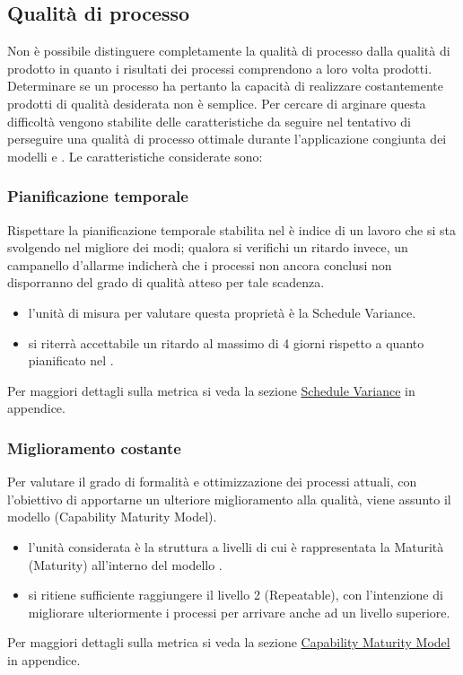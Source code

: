 \documentclass[a4paper, titlepage]{article}
\begin{document}
\subsection{Qualità di processo}
Non è possibile distinguere completamente la qualità di processo dalla qualità di prodotto in quanto i risultati dei processi comprendono a loro volta prodotti. Determinare se un processo ha pertanto la capacità di realizzare costantemente prodotti di qualità desiderata non è semplice. 
\newline Per cercare di arginare questa difficoltà vengono stabilite delle caratteristiche da seguire nel tentativo di perseguire una qualità di processo ottimale durante l'applicazione congiunta dei modelli  e .
\newline Le caratteristiche considerate sono:

\subsubsection{Pianificazione temporale}
Rispettare la pianificazione temporale stabilita nel  è indice di un lavoro che si sta svolgendo nel migliore dei modi; qualora si verifichi un ritardo invece, un campanello d'allarme indicherà che i processi non ancora conclusi non disporranno del grado di qualità atteso per tale scadenza.
\begin{itemize}
\item {} l'unità di misura per valutare questa proprietà è la Schedule Variance.
\item {} si riterrà accettabile un ritardo al massimo di 4 giorni rispetto a quanto pianificato nel .
\end{itemize}
Per maggiori dettagli sulla metrica si veda la sezione \hyperref[par:SV]{Schedule Variance} in appendice.

\subsubsection{Miglioramento costante}
Per valutare il grado di formalità e ottimizzazione dei processi attuali, con l'obiettivo di apportarne un ulteriore miglioramento alla qualità, viene assunto il modello  (Capability Maturity Model).
\begin{itemize}
\item {} l'unità considerata è la struttura a livelli di cui è rappresentata la Maturità (Maturity) all'interno del modello .
\item {} si ritiene sufficiente raggiungere il livello 2 (Repeatable), con l'intenzione di migliorare ulteriormente i processi per arrivare anche ad un livello superiore.
\end{itemize}
Per maggiori dettagli sulla metrica si veda la sezione \hyperref[par:cmm]{Capability Maturity Model} in appendice. 
\end{document}
